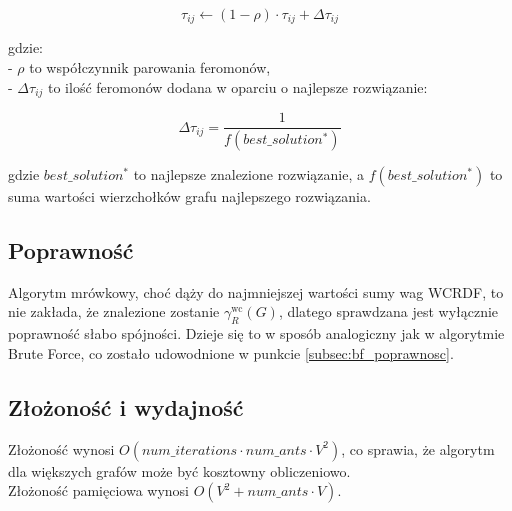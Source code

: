 \[
\tau_{ij} \leftarrow (1 - \rho) \cdot \tau_{ij} + \Delta \tau_{ij}
\]

gdzie:\\
- \( \rho \) to współczynnik parowania feromonów,\\
- \( \Delta \tau_{ij} \) to ilość feromonów dodana w oparciu o najlepsze rozwiązanie:

\[
\Delta \tau_{ij} = \frac{1}{f(best\_solution^*)}
\]

gdzie \( best\_solution^* \) to najlepsze znalezione rozwiązanie, a \( f(best\_solution^*) \) to suma wartości wierzchołków grafu najlepszego rozwiązania.

\subsection{Poprawność}
Algorytm mrówkowy, choć dąży do najmniejszej wartości sumy wag WCRDF, to nie zakłada, że znalezione zostanie $\gamma^{\text{wc}}_R(G)$, dlatego sprawdzana jest wyłącznie poprawność słabo spójności. Dzieje się to w sposób analogiczny jak w algorytmie Brute Force, co zostało udowodnione w punkcie \ref{subsec:bf_poprawnosc}.

\subsection{Złożoność i wydajność}

Złożoność wynosi $O(num\_iterations \cdot num\_ants \cdot V^2)$, co sprawia, że algorytm dla większych grafów może być kosztowny obliczeniowo.\\
Złożoność pamięciowa wynosi $O(V^2+num\_ants \cdot V)$.

